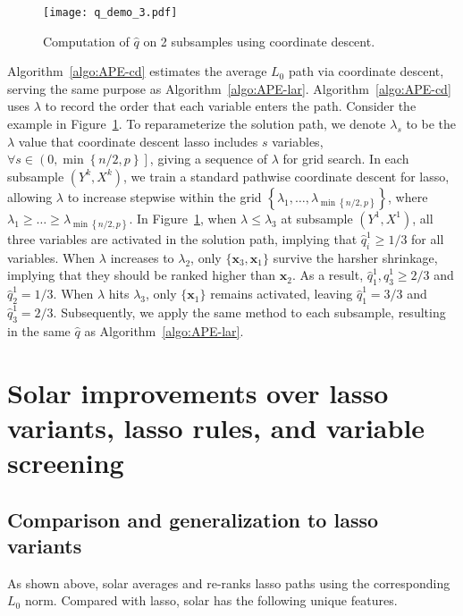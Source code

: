\documentclass[11pt,authoryear]{elsarticle}
\begin{document}
\begin{figure}[h]
  \centering
  \texttt{[image: q\_demo\_3.pdf]}
  \caption{Computation of $\widehat{q}$ on 2 subsamples using coordinate descent.}
  \label{fig:q_demo_3}
\end{figure}

Algorithm~\ref{algo:APE-cd} estimates the average $L_0$ path via coordinate descent, serving the same purpose as Algorithm~\ref{algo:APE-lar}. Algorithm~\ref{algo:APE-cd} uses $\lambda$ to record the order that each variable enters the path. Consider the example in Figure~\ref{fig:q_demo_3}. To reparameterize the solution path, we denote $\lambda_s$ to be the $\lambda$ value that coordinate descent lasso includes $s$ variables, $\forall s\in \left( 0, \min \left\{ n/2, p \right\} \right]$, giving a sequence of $\lambda$ for grid search. In each subsample $\left( Y^k, X^k \right)$, we train a standard pathwise coordinate descent for lasso, allowing $\lambda$ to increase stepwise within the grid $\left\{\lambda_1, \ldots, \lambda_{ \min \left\{ n/2, p \right\} } \right\}$, where $\lambda_1 \geqslant \ldots \geqslant \lambda_{ \min \left\{ n/2, p \right\} }$. In Figure~\ref{fig:q_demo_3}, when $\lambda \leqslant \lambda_3$ at subsample $\left( Y^1, X^1 \right)$, all three variables are activated in the solution path, implying that $\widehat{q}^1_i \geqslant 1/3$ for all variables. When $\lambda$ increases to $\lambda_2$, only $\{\mathbf{x}_3, \mathbf{x}_1\}$ survive the harsher shrinkage, implying that they should be ranked higher than $\mathbf{x}_2$. As a result, $\widehat{q}^1_1, \widehat{q}^1_3 \geqslant 2/3$ and $\widehat{q}^1_2 = 1/3$. When $\lambda$ hits $\lambda_3$, only $\{\mathbf{x}_1\}$ remains activated, leaving $\widehat{q}^1_1 = 3/3$ and $\widehat{q}^1_3 = 2/3$. Subsequently, we apply the same method to each subsample, resulting in the same $\widehat{q}$ as Algorithm~\ref{algo:APE-lar}.

\section{Solar improvements over lasso variants, lasso rules, and variable screening \label{section:adv}}

\subsection{Comparison and generalization to lasso variants}

As shown above, solar averages and re-ranks lasso paths using the corresponding $L_0$ norm. Compared with lasso, solar has the following unique features.
\end{document}
